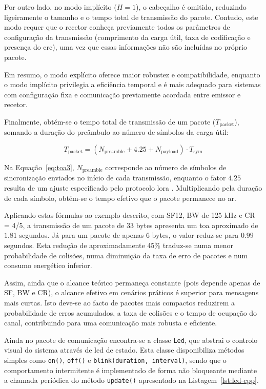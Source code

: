 Por outro lado, no modo implícito ($H = 1$), o cabeçalho é omitido, reduzindo ligeiramente o tamanho e o tempo total de transmissão do pacote. Contudo, este modo requer que o recetor conheça previamente todos os parâmetros de configuração da transmissão (comprimento da carga útil, taxa de codificação e presença do \gls{crc}), uma vez que essas informações não são incluídas no próprio pacote.  

Em resumo, o modo explícito oferece maior robustez e compatibilidade, enquanto o modo implícito privilegia a eficiência temporal e é mais adequado para sistemas com configuração fixa e comunicação previamente acordada entre emissor e recetor.

Finalmente, obtém-se o tempo total de transmissão de um pacote ($T_{\text{packet}}$), somando a duração do preâmbulo ao número de símbolos da carga útil:

\begin{equation}
T_{\text{packet}} = \left( N_{\text{preamble}} + 4.25 + N_{\text{payload}} \right) \cdot T_{\text{sym}}
\label{eq:toa3}
\end{equation}

Na Equação~\ref{eq:toa3}, $N_{\text{preamble}}$ corresponde ao número de símbolos de sincronização enviados no início de cada transmissão, enquanto o fator $4.25$ resulta de um ajuste especificado pelo protocolo \gls{lora} \cite{ttn-lora-phy-format}. Multiplicando pela duração de cada símbolo, obtém-se o tempo efetivo que o pacote permanece no ar.  

Aplicando estas fórmulas ao exemplo descrito, com SF12, BW de 125 kHz e CR = 4/5, a transmissão de um pacote de 33 bytes apresenta um \gls{toa} aproximado de $1.81$ segundos. Já para um pacote de apenas 6 bytes, o valor reduz-se para $0.99$ segundos. Esta redução de aproximadamente 45\% traduz-se numa menor probabilidade de colisões, numa diminuição da taxa de erro de pacotes e num consumo energético inferior.  

Assim, ainda que o alcance teórico permaneça constante (pois depende apenas de SF, BW e CR), o alcance efetivo em cenários práticos é superior para mensagens mais curtas. Isto deve-se ao facto de pacotes mais compactos reduzirem a probabilidade de erros acumulados, a taxa de colisões e o tempo de ocupação do canal, contribuindo para uma comunicação mais robusta e eficiente.

Ainda no pacote de comunicação encontra-se a classe \texttt{Led}, que abstrai o controlo visual do sistema através de \gls{led} de estado. Esta classe disponibiliza métodos simples como \texttt{on()}, \texttt{off()} e \texttt{blink(duration, interval)}, sendo que o comportamento intermitente é implementado de forma não bloqueante mediante a chamada periódica do método \texttt{update()} apresentado na Listagem~\ref{lst:led-cpp}.

